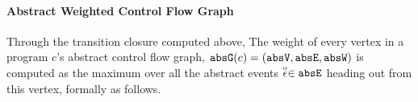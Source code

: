 \paragraph{Abstract Weighted Control Flow Graph}
Through the transition closure computed above, 
The weight of every vertex in 
a program $c$'s abstract control flow graph,
$\mathtt{abs}{\mathtt{G}}(c) =(\mathtt{abs}{\mathtt{V}}, \mathtt{abs}{\mathtt{E}}, \mathtt{abs}{\mathtt{W}})$
is 
computed as the maximum over all the abstract events $\stackrel{\scriptscriptstyle{\alpha}}{\mathtt{\epsilon}{}} \in \mathtt{abs}{\mathtt{E}}$ heading out from this vertex, formally as follows.
\\
%
